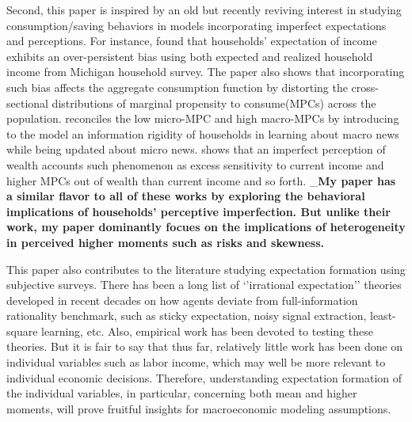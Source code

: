 \documentclass[12pt,notitlepage,onecolumn,aps,pra]{revtex4-1}
\begin{document}
Second, this paper is inspired by an old but recently reviving interest
in studying consumption/saving behaviors in models incorporating
imperfect expectations and perceptions. For instance,
\cite{rozsypal_overpersistence_2017} found that households' expectation
of income exhibits an over-persistent bias using both expected and
realized household income from Michigan household survey. The paper also
shows that incorporating such bias affects the aggregate consumption
function by distorting the cross-sectional distributions of marginal
propensity to consume(MPCs) across the population.
\cite{carroll_sticky_2018} reconciles the low micro-MPC and high
macro-MPCs by introducing to the model an information rigidity of
households in learning about macro news while being updated about micro
news. \cite{Lian_imperfect_2019} shows that an imperfect perception of
wealth accounts such phenomenon as excess sensitivity to current income
and higher MPCs out of wealth than current income and so forth.
\_\textbf{My paper has a similar flavor to all of these works by
exploring the behavioral implications of households' perceptive
imperfection. But unlike their work, my paper dominantly focues on the
implications of heterogeneity in perceived higher moments such as risks
and skewness.}

This paper also contributes to the literature studying expectation
formation using subjective surveys. There has been a long list of
`'irrational expectation'' theories developed in recent decades on how
agents deviate from full-information rationality benchmark, such as
sticky expectation, noisy signal extraction, least-square learning, etc.
Also, empirical work has been devoted to testing these theories. But it
is fair to say that thus far, relatively little work has been done on
individual variables such as labor income, which may well be more
relevant to individual economic decisions. Therefore, understanding
expectation formation of the individual variables, in particular,
concerning both mean and higher moments, will prove fruitful insights
for macroeconomic modeling assumptions.
\end{document}
